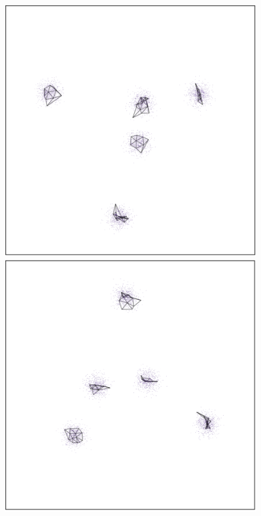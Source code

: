 \documentclass[
  12pt]{article}
\begin{document}
\begin{figure}[H]

\begin{minipage}{0.33\linewidth}
\includegraphics{figures/five_gau_clusters/sc_trimap_1.png}\end{minipage}%
%
\begin{minipage}{0.33\linewidth}
\includegraphics{figures/five_gau_clusters/sc_trimap_2.png}\end{minipage}%

\end{figure}
\end{document}
